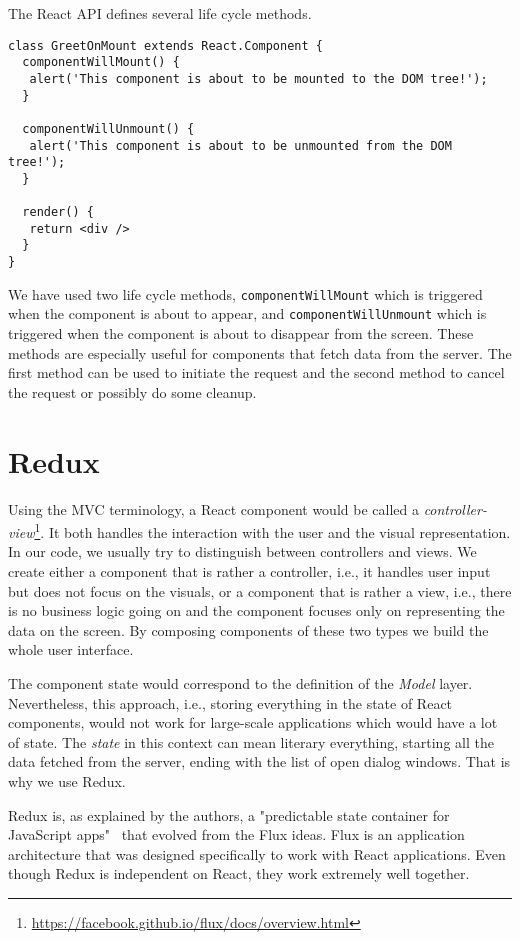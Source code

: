 The React API defines several life cycle methods.

\begin{verbatim}
class GreetOnMount extends React.Component {
  componentWillMount() {
   alert('This component is about to be mounted to the DOM tree!');
  }
  
  componentWillUnmount() {
   alert('This component is about to be unmounted from the DOM tree!');
  }
  
  render() {
   return <div />
  }
}
\end{verbatim}

We have used two life cycle methods, \texttt{componentWillMount} which is triggered when the component is about to appear, and \texttt{componentWillUnmount} which is triggered when the component is about to disappear from the screen. These methods are especially useful for components that fetch data from the server. The first method can be used to initiate the request and the second method to cancel the request or possibly do some cleanup.

\section{Redux}
\label{att:devstack:redux}

Using the MVC terminology, a React component would be called a \emph{controller-view}\footnote{\url{https://facebook.github.io/flux/docs/overview.html}}. It both handles the interaction with the user and the visual representation. In our code, we usually try to distinguish between controllers and views. We create either a component that is rather a controller, i.e., it handles user input but does not focus on the visuals, or a component that is rather a view, i.e., there is no business logic going on and the component focuses only on representing the data on the screen. By composing components of these two types we build the whole user interface.

The component state would correspond to the definition of the \emph{Model} layer. Nevertheless, this approach, i.e., storing everything in the state of React components, would not work for large-scale applications which would have a lot of state. The \emph{state} in this context can mean literary everything, starting all the data fetched from the server, ending with the list of open dialog windows. That is why we use Redux.

Redux \cite{redux} is, as explained by the authors, a "predictable state container for JavaScript apps"~\cite{redux} that evolved from the Flux ideas. Flux \cite{flux} is an application architecture that was designed specifically to work with React applications. Even though Redux is independent on React, they work extremely well together. 

